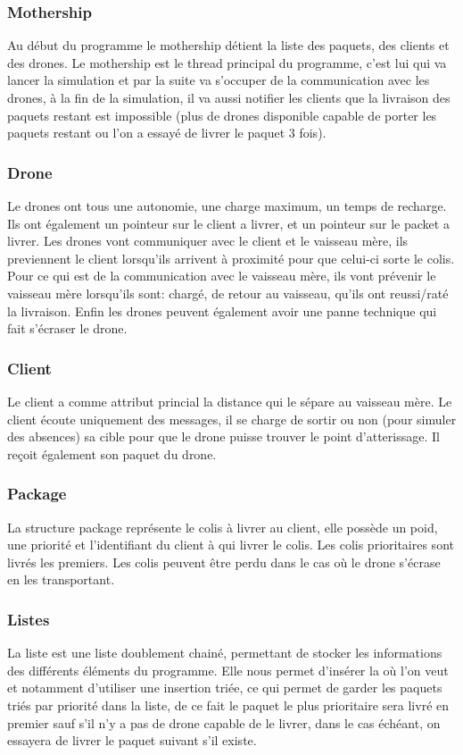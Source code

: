 \documentclass[article, backcover, french, nodocumentinfo]{upmethodology-document}
\begin{document}
			\subsubsection{Mothership}
			Au début du programme le mothership détient la liste des paquets, des clients et des drones.
			Le mothership est le thread principal du programme, c'est lui qui va lancer la simulation et par la suite va s'occuper de
			la communication avec les drones, à la fin de la simulation, il va aussi notifier les clients que la livraison des paquets
			restant est impossible (plus de drones disponible capable de porter les paquets restant ou l'on a essayé de livrer le paquet 3 fois).
			\subsubsection{Drone}
			Le drones ont tous une autonomie, une charge maximum, un temps de recharge. Ils ont également un pointeur sur le client a livrer,
			et un pointeur sur le packet a livrer.
			Les drones vont communiquer avec le client et le vaisseau mère, ils previennent le client lorsqu'ils arrivent à proximité pour que
			celui-ci sorte le colis. Pour ce qui est de la communication avec le vaisseau mère, ils vont prévenir le vaisseau mère lorsqu'ils sont:
			chargé, de retour au vaisseau, qu'ils ont reussi/raté la livraison.
			Enfin les drones peuvent également avoir une panne technique qui fait s'écraser le drone.
			\subsubsection{Client}
			Le client a comme attribut princial la distance qui le sépare au vaisseau mère. Le client écoute uniquement des messages,
			il se charge de sortir ou non (pour simuler des absences) sa cible pour que le drone puisse trouver le point d'atterissage.
			Il reçoit également son paquet du drone.
			\subsubsection{Package}
			La structure package représente le colis à livrer au client, elle possède un poid, une priorité et l'identifiant du client à qui livrer le colis.
			Les colis prioritaires sont livrés les premiers. Les colis peuvent être perdu dans le cas où le drone s'écrase en les transportant.
			\subsubsection{Listes}
			La liste est une liste doublement chainé, permettant de stocker les informations des différents éléments du programme.
			Elle nous permet d'insérer la où l'on veut et notamment d'utiliser une insertion triée, ce qui permet de garder les paquets
			triés par priorité dans la liste, de ce fait le paquet le plus prioritaire sera livré en premier sauf s'il n'y a pas de drone
			capable de le livrer, dans le cas échéant, on essayera de livrer le paquet suivant s'il existe.
\end{document}
